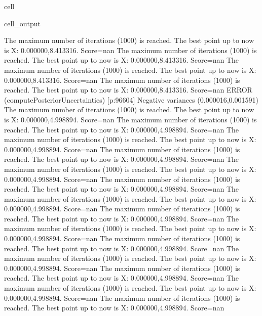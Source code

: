 \documentclass[letterpaper,10pt,english]{jupyterBook}
\begin{document}
\begin{sphinxuseclass}{cell}
\begin{sphinxVerbatimOutput}
\begin{sphinxuseclass}{cell_output}
\begin{sphinxVerbatim}[commandchars=\\\{\}]
The maximum number of iterations (1000) is reached. The best point up to now is X: \PYGZob{}0.000000,8.413316\PYGZcb{}. Score=\PYGZhy{}nan
The maximum number of iterations (1000) is reached. The best point up to now is X: \PYGZob{}0.000000,8.413316\PYGZcb{}. Score=\PYGZhy{}nan
The maximum number of iterations (1000) is reached. The best point up to now is X: \PYGZob{}0.000000,8.413316\PYGZcb{}. Score=\PYGZhy{}nan
The maximum number of iterations (1000) is reached. The best point up to now is X: \PYGZob{}0.000000,8.413316\PYGZcb{}. Score=\PYGZhy{}nan
ERROR (compute\PYGZus{}Posterior\PYGZus{}Uncertainties) [p:96604] Negative variances (\PYGZhy{}0.000016,0.001591)
The maximum number of iterations (1000) is reached. The best point up to now is X: \PYGZob{}0.000000,\PYGZhy{}4.998894\PYGZcb{}. Score=\PYGZhy{}nan
The maximum number of iterations (1000) is reached. The best point up to now is X: \PYGZob{}0.000000,\PYGZhy{}4.998894\PYGZcb{}. Score=\PYGZhy{}nan
The maximum number of iterations (1000) is reached. The best point up to now is X: \PYGZob{}0.000000,\PYGZhy{}4.998894\PYGZcb{}. Score=\PYGZhy{}nan
The maximum number of iterations (1000) is reached. The best point up to now is X: \PYGZob{}0.000000,\PYGZhy{}4.998894\PYGZcb{}. Score=\PYGZhy{}nan
The maximum number of iterations (1000) is reached. The best point up to now is X: \PYGZob{}0.000000,\PYGZhy{}4.998894\PYGZcb{}. Score=\PYGZhy{}nan
The maximum number of iterations (1000) is reached. The best point up to now is X: \PYGZob{}0.000000,\PYGZhy{}4.998894\PYGZcb{}. Score=\PYGZhy{}nan
The maximum number of iterations (1000) is reached. The best point up to now is X: \PYGZob{}0.000000,\PYGZhy{}4.998894\PYGZcb{}. Score=\PYGZhy{}nan
The maximum number of iterations (1000) is reached. The best point up to now is X: \PYGZob{}0.000000,\PYGZhy{}4.998894\PYGZcb{}. Score=\PYGZhy{}nan
The maximum number of iterations (1000) is reached. The best point up to now is X: \PYGZob{}0.000000,\PYGZhy{}4.998894\PYGZcb{}. Score=\PYGZhy{}nan
The maximum number of iterations (1000) is reached. The best point up to now is X: \PYGZob{}0.000000,\PYGZhy{}4.998894\PYGZcb{}. Score=\PYGZhy{}nan
The maximum number of iterations (1000) is reached. The best point up to now is X: \PYGZob{}0.000000,\PYGZhy{}4.998894\PYGZcb{}. Score=\PYGZhy{}nan
The maximum number of iterations (1000) is reached. The best point up to now is X: \PYGZob{}0.000000,\PYGZhy{}4.998894\PYGZcb{}. Score=\PYGZhy{}nan
The maximum number of iterations (1000) is reached. The best point up to now is X: \PYGZob{}0.000000,\PYGZhy{}4.998894\PYGZcb{}. Score=\PYGZhy{}nan
The maximum number of iterations (1000) is reached. The best point up to now is X: \PYGZob{}0.000000,\PYGZhy{}4.998894\PYGZcb{}. Score=\PYGZhy{}nan

\end{sphinxVerbatim}
\end{sphinxuseclass}
\end{sphinxVerbatimOutput}
\end{sphinxuseclass}
\end{document}
